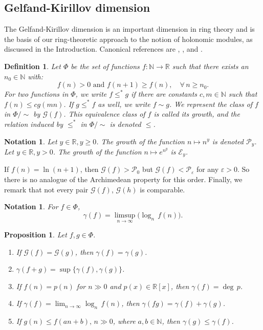 \documentclass[10pt,a4paper]{amsart}
\newtheorem{proposition}[theorem]{Proposition}
\newtheorem{definition}[theorem]{Definition}
\newtheorem{notation}[theorem]{Notation}
\begin{document}
\subsection{Gelfand-Kirillov dimension}
The Gelfand-Kirillov dimension is an important dimension in ring theory and is the basis of our ring-theoretic approach to the notion of holonomic modules, as discussed in the Introduction. Canonical references are \cite{KL}, \cite{Lorenz0}, and \cite[Chapter 8]{McConnell}.
\begin{definition}
Let $\Phi$ be the set of functions $f: \mathbb{N} \rightarrow \mathbb{R}$ such that there exists an $n_0 \in \mathbb{N}$ with:
\[f(n)>0\text{ and } f(n+1) \geq f(n), \quad\forall \, n \geq n_0.\]
For two functions in $\Phi$, we write $f \leq^* g$ if there are constants $c, m \in \mathbb{N}$ such that $f(n) \leq cg(mn)$. If $g \leq^* f$ as well, we write $f \sim g$. We represent the class of $f$ in $\Phi/\sim$ by $\mathcal{G}(f)$. This equivalence class of $f$ is called its \emph{growth}, and the relation induced by $ \leq^* $ in $\Phi/\sim$ is denoted $\leq$.
\end{definition}
\begin{notation}
Let $y \in \mathbb{R}, y \geq 0$. The growth of the function $n \mapsto n^y$ is denoted $\mathcal{P}_y$.
Let $y \in \mathbb{R}, y>0$. The growth of the function $n \mapsto e^{n^y}$ is $\mathcal{E}_y$.
\end{notation}
If $f(n)=\ln(n+1)$, then $\mathcal{G}(f) > \mathcal{P}_0$ but $\mathcal{G}(f) < \mathcal{P}_\varepsilon$ for any $\varepsilon >0$. So there is no analogue of the Archimedean property for this order.
Finally, we remark that not every pair $\mathcal{G}(f)$, $\mathcal{G}(h)$ is comparable.
\begin{notation}\label{asymptotic}
For $f \in \Phi$,
\[\gamma(f)= \limsup_{n \to \infty}\big(\log_n \, f(n)\big).\]
\end{notation}
\begin{proposition}\label{growth}
    Let $f,g \in \Phi$.
    \begin{enumerate}
        \item If $\mathcal{G}(f)=\mathcal{G}(g)$, then $\gamma(f)=\gamma(g)$.
        \item $\gamma(f+g)=\sup \{ \gamma(f), \gamma(g) \}$.
        \item If $f(n)=p(n)$ for $n\gg 0$ and $p(x) \in \mathbb{R}[x]$, then $\gamma(f)=\deg \, p$.
        \item If $\gamma(f)=\lim_{n \to \infty} \log_n \, f(n)$, then $\gamma(fg)= \gamma(f)+\gamma(g)$.
        \item If $g(n) \leq f(an+b), \, n\gg 0$, where $a,b \in \mathbb{N}$, then $\gamma(g) \leq \gamma(f)$.
    \end{enumerate}
\end{proposition}
\end{document}

